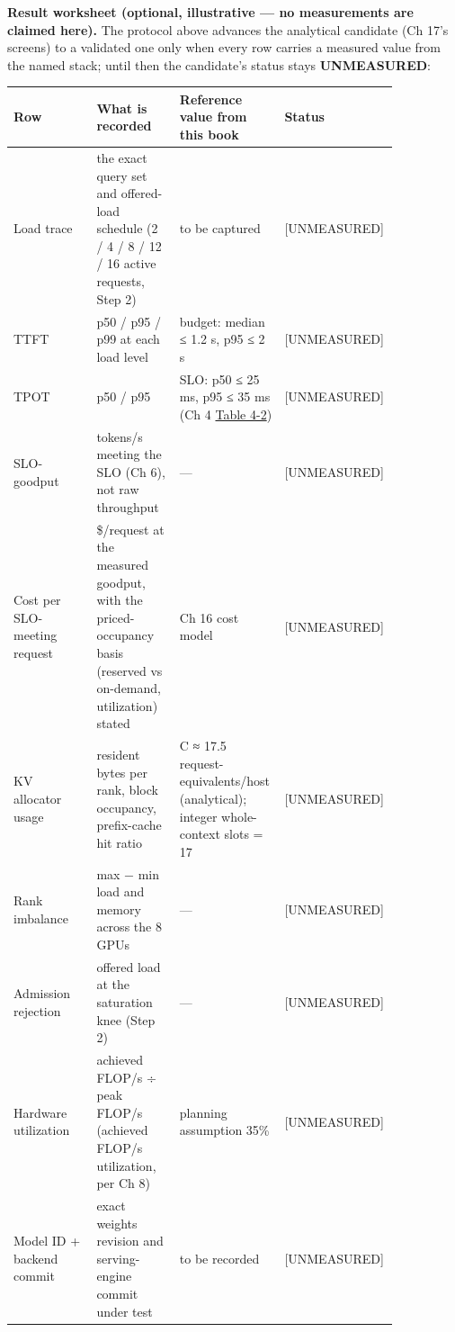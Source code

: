 \textbf{Result worksheet (optional, illustrative --- no measurements are
claimed here).} The protocol above advances the analytical candidate (Ch
17's screens) to a validated one only when every row carries a measured
value from the named stack; until then the candidate's status stays
\textbf{UNMEASURED}:

\nopagebreak[4]
\begin{longtable}[]{@{}
  >{\raggedright\arraybackslash}p{0.2127\linewidth}
  >{\raggedright\arraybackslash}p{0.2127\linewidth}
  >{\raggedright\arraybackslash}p{0.2127\linewidth}
  >{\raggedright\arraybackslash}p{0.2127\linewidth}@{}}
\toprule\noalign{}
\begin{minipage}[b]{\linewidth}\raggedright
Row
\end{minipage} & \begin{minipage}[b]{\linewidth}\raggedright
What is recorded
\end{minipage} & \begin{minipage}[b]{\linewidth}\raggedright
Reference value from this book
\end{minipage} & \begin{minipage}[b]{\linewidth}\raggedright
Status
\end{minipage} \\
\midrule\noalign{}
\endhead
\bottomrule\noalign{}
\endlastfoot
Load trace & the exact query set and offered-load schedule (2 / 4 / 8 /
12 / 16 active requests, Step 2) & to be captured & \mbox{{[}UNMEASURED{]}} \\
\noalign{\label{tab:14.2}}
TTFT & p50 / p95 / p99 at each load level & budget: median ≤ 1.2 s, p95
≤ 2 s & \mbox{{[}UNMEASURED{]}} \\
TPOT & p50 / p95 & SLO: p50 ≤ 25 ms, p95 ≤ 35 ms (Ch 4 \hyperref[tab:4.2]{Table 4-2}) &
\mbox{{[}UNMEASURED{]}} \\
SLO-goodput & tokens/s meeting the SLO (Ch 6), not raw throughput & ---
& \mbox{{[}UNMEASURED{]}} \\
Cost per SLO-meeting request & \$/request at the measured goodput, with
the priced-occupancy basis (reserved vs on-demand, utilization) stated &
Ch 16 cost model & \mbox{{[}UNMEASURED{]}} \\
KV allocator usage & resident bytes per rank, block occupancy,
prefix-cache hit ratio & C ≈ 17.5 request-equivalents/host (analytical);
integer whole-context slots = 17 & \mbox{{[}UNMEASURED{]}} \\
Rank imbalance & max − min load and memory across the 8 GPUs & --- &
\mbox{{[}UNMEASURED{]}} \\
Admission rejection & offered load at the saturation knee (Step 2) & ---
& \mbox{{[}UNMEASURED{]}} \\
Hardware utilization & achieved FLOP/s ÷ peak FLOP/s (achieved FLOP/s
utilization, per Ch 8) & planning assumption 35\% & \mbox{{[}UNMEASURED{]}} \\
Model ID + backend commit & exact weights revision and serving-engine
commit under test & to be recorded & \mbox{{[}UNMEASURED{]}} \\
\end{longtable}

